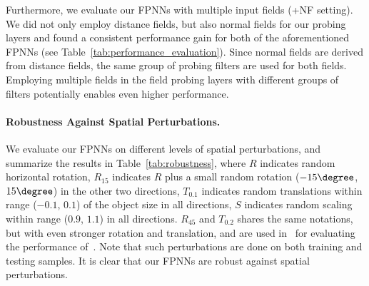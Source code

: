 Furthermore, we evaluate our FPNNs with multiple input fields (+NF setting). We did not only employ distance fields, but also normal fields for our probing layers and found a consistent performance gain for both of the aforementioned FPNNs (see Table~\ref{tab:performance_evaluation}). Since normal fields are derived from distance fields, the same group of probing filters are used for both fields. Employing multiple fields in the field probing layers with different groups of filters potentially enables even higher performance.

\begin{table}
	\vspace{-0.9cm}
	\begin{center}
	\end{center}
	\vspace{-0.3cm}
	\caption{Performance on different perturbations.}
	\label{tab:robustness}
	\vspace{-0.5cm}
\end{table}

\paragraph{Robustness Against Spatial Perturbations.} We evaluate our FPNNs on different levels of spatial perturbations, and summarize the results in Table~\ref{tab:robustness}, where $R$ indicates random horizontal rotation, $R_{15}$ indicates $R$ plus a small random rotation ($-15\degree$, $15\degree$) in the other two directions, $T_{0.1}$ indicates random translations within range ($-0.1$, $0.1$) of the object size in all directions, $S$ indicates random scaling within range ($0.9$, $1.1$) in all directions. $R_{45}$ and $T_{0.2}$ shares the same notations, but with even stronger rotation and translation, and are used in~\cite{qi2016volumetric} for evaluating the performance of~\cite{WU_CVPR15_3D}. Note that such perturbations are done on both training and testing samples. It is clear that our FPNNs are robust against spatial perturbations.

